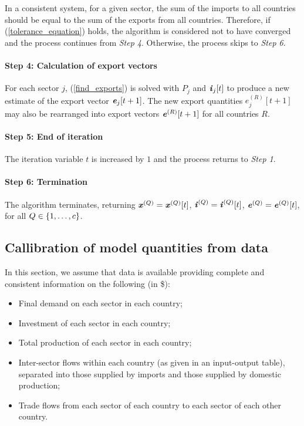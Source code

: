 \documentclass[preprint,authoryear,3p]{elsarticle}
\begin{document}
In a consistent system, for a given sector, the sum of the imports to all countries should be equal to the sum of the exports from all countries. Therefore, if (\ref{tolerance_equation}) holds, the algorithm is considered not to have converged and the process continues from \textit{Step 4}. Otherwise, the process skips to \textit{Step 6}.

\paragraph{Step 4: Calculation of export vectors} For each sector $j$, (\ref{find_exports}) is solved with $P_j$ and $\textbf{\textit{i}}_j[t]$ to produce a new estimate of the export vector $\textbf{\textit{e}}_j[t+1]$. The new export quantities $e^{(R)}_j[t+1]$ may also be rearranged into export vectors $\textbf{\textit{e}}^{(R)}[t+1]$ for all countries $R$.

\paragraph{Step 5: End of iteration} The iteration variable $t$ is increased by $1$ and the process returns to \textit{Step 1}.

\paragraph{Step 6: Termination} The algorithm terminates, returning $\textbf{\textit{x}}^{(Q)} = \textbf{\textit{x}}^{(Q)}[t]$, $\textbf{\textit{i}}^{(Q)} = \textbf{\textit{i}}^{(Q)}[t]$, $\textbf{\textit{e}}^{(Q)} = \textbf{\textit{e}}^{(Q)}[t]$, for all $Q \in \{ 1, \mathellipsis, c \}$.





\subsection{Callibration of model quantities from data}

In this section, we assume that data is available providing complete and consistent information on the following (in \$):

\begin{itemize}
\item Final demand on each sector in each country;
\item Investment of each sector in each country;
\item Total production of each sector in each country;
\item Inter-sector flows within each country (as given in an input-output table), separated into those supplied by imports and those supplied by domestic production;
\item Trade flows from each sector of each country to each sector of each other country.
\end{itemize}
\end{document}
